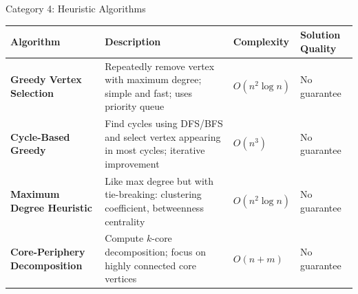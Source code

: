 \documentclass[aspectratio=169]{beamer}
\begin{document}

\begin{frame}{Category 4: Heuristic Algorithms}
	\begin{table}
		\tiny
		\begin{tabular}{@{}p{3.5cm}p{5.5cm}p{2cm}p{2cm}@{}}
			\toprule
			\textbf{Algorithm}                                                                          & \textbf{Description} & \textbf{Complexity} & \textbf{Solution Quality} \\
			\midrule

			\textbf{Greedy Vertex Selection}                                                            &
			Repeatedly remove vertex with maximum degree; simple and fast; uses priority queue          &
			$O(n^2 \log n)$                                                                             &
			No guarantee                                                                                                                                                         \\
			\midrule

			\textbf{Cycle-Based Greedy}                                                                 &
			Find cycles using DFS/BFS and select vertex appearing in most cycles; iterative improvement &
			$O(n^3)$                                                                                    &
			No guarantee                                                                                                                                                         \\
			\midrule

			\textbf{Maximum Degree Heuristic}                                                           &
			Like max degree but with tie-breaking: clustering coefficient, betweenness centrality       &
			$O(n^2 \log n)$                                                                             &
			No guarantee                                                                                                                                                         \\
			\midrule

			\textbf{Core-Periphery Decomposition}                                                       &
			Compute $k$-core decomposition; focus on highly connected core vertices                     &
			$O(n + m)$                                                                                  &
			No guarantee                                                                                                                                                         \\
			\midrule


\end{tabular}
\end{table}
\end{frame}
\end{document}
